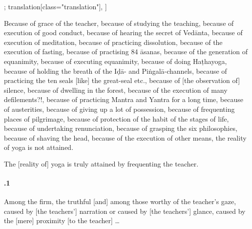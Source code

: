 \begin{alignment}[
  texts=edition[class="edition"];
  translation[class="translation"],
  ]
\begin{translation}
\begin{tlate}
Because of grace of the teacher, because of studying the teaching, because of execution of good conduct, because of hearing the secret of Vedānta, because of execution of meditation, because of practicing dissolution, because of the execution of fasting, because of practising 84 āsanas, because of the generation of equanimity, because of executing equanimity, because of doing Haṭhayoga, because of holding the breath of the Iḍā- and Piṅgalā-channels, because of practicing the ten seals [like] the great-seal etc., because of [the observation of] silence, because of dwelling in the forest, because of the execution of many defilements?!, because of practicing Mantra and Yantra for a long time, because of austerities, because of giving up a lot of possession, because of frequenting places of pilgrimage, because of protection of the habit of the stages of life, because of undertaking renunciation, because of grasping the six philosophies, because of shaving the head, because of the execution of other means, the reality of yoga is not attained.

The [reality of] yoga is truly attained by frequenting the teacher.

\paragraph{.1} Among the firm, the truthful [and] among those worthy of the teacher's gaze, caused by [the teachers'] narration or caused by [the teachers'] glance, caused by the [mere] proximity [to the teacher] \ldots
    \end{tlate}
  \end{translation}
\end{alignment}
\pagebreak %
